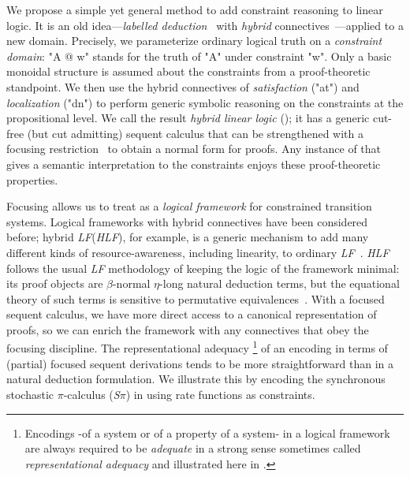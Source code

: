 \documentclass{article}
\newcommand\proofsystem[1]{{\smaller\rmfamily\slshape #1}\xspace}
\newcommand\LF{\proofsystem{LF}}
\newcommand\HLF{\proofsystem{HLF}}
\newcommand\Spi{\proofsystem{S$\pi$}}
\begin{document}
We propose a simple yet general method to add constraint reasoning to linear logic.
It is an old idea---\emph{labelled deduction}~\cite{simpson94phd} with 
\emph{hybrid} connectives~\cite{brauener06jal}---applied to a new domain. 
Precisely, we parameterize ordinary logical truth on a \emph{constraint domain}: 
"A @ w" stands for the truth of "A" under constraint "w". 
Only a basic monoidal structure is assumed about the constraints from a
proof-theoretic standpoint.
We then use the hybrid connectives of \emph{satisfaction} ("at") and
\emph{localization} ("dn") to perform generic symbolic reasoning on the
constraints at the propositional level.
We call the result \emph{hybrid linear logic} (\hyll); it has a generic cut-free
(but cut admitting) sequent calculus that can be strengthened with a focusing
restriction~\cite{andreoli92jlc} to obtain a normal form for proofs.
Any instance of \hyll that gives a semantic interpretation to the constraints
enjoys these proof-theoretic properties.

Focusing allows us to treat \hyll as a \emph{logical framework} 
for constrained transition systems.
Logical frameworks with hybrid connectives have been considered before; hybrid
\LF (\HLF), for example, is a generic mechanism to add many different kinds of
resource-awareness, including linearity, to ordinary \LF~\cite{reed06hylo}.
\HLF follows the usual \LF methodology of keeping the logic of the framework
minimal: its proof objects are $\beta$-normal $\eta$-long natural deduction
terms, but the equational theory of such terms is sensitive to permutative
equivalences~\cite{watkins03tr}.
With a focused sequent calculus, we have more direct access to a canonical
representation of proofs, so we can enrich the framework with any connectives
that obey the focusing discipline.
The representational adequacy \footnote
{Encodings -of a system or of a property of a system- in a logical framework
are always required to be {\it adequate} in a strong sense 
sometimes called {\it representational adequacy} and illustrated here in .
}
of an encoding in terms of (partial) focused
sequent derivations tends to be more straightforward than in a natural deduction
formulation.
We illustrate this by encoding the synchronous stochastic $\pi$-calculus (\Spi)
in \hyll using rate functions as constraints.
\end{document}
